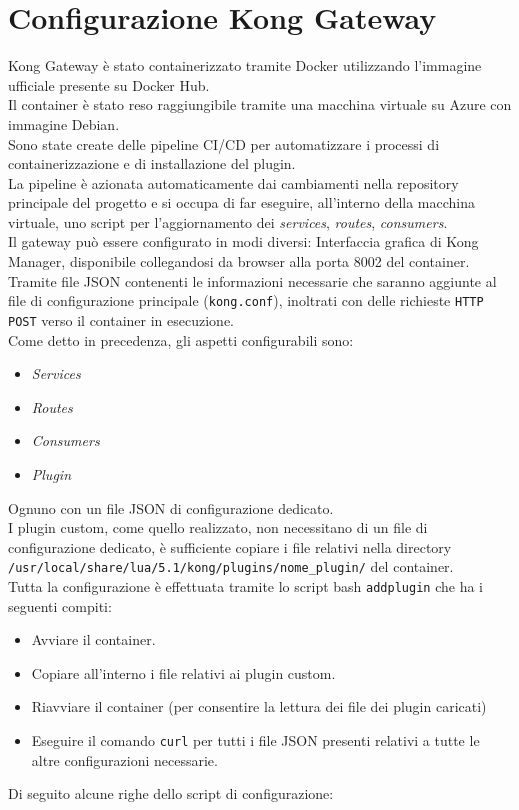 \section{Configurazione Kong Gateway}\label{sec:kongconf}
Kong Gateway è stato containerizzato tramite Docker utilizzando l'immagine ufficiale presente su Docker Hub.\\
Il container è stato reso raggiungibile tramite una macchina virtuale su Azure con immagine Debian.\\
Sono state create delle pipeline CI/CD per automatizzare i processi di containerizzazione e di installazione del plugin.\\
La pipeline è azionata automaticamente dai cambiamenti nella repository principale del progetto e si occupa di far eseguire, all'interno della macchina virtuale, uno script per l'aggiornamento dei \emph{services}, \emph{routes}, \emph{consumers}.\\

Il gateway può essere configurato in modi diversi:
Interfaccia grafica di Kong Manager, disponibile collegandosi da browser alla porta 8002 del container.
Tramite file JSON contenenti le informazioni necessarie che saranno aggiunte al file di configurazione principale (\texttt{kong.conf}), inoltrati con delle richieste \texttt{HTTP POST} verso il container in esecuzione.
\\
Come detto in precedenza, gli aspetti configurabili sono:
\begin{itemize}
	\item\emph{Services}
	\item\emph{Routes}
	\item\emph{Consumers}
	\item\emph{Plugin}
\end{itemize}

Ognuno con un file JSON di configurazione dedicato.\\
I plugin custom, come quello realizzato, non necessitano di un file di configurazione dedicato, è sufficiente copiare i file relativi nella directory\\
\texttt{/usr/local/share/lua/5.1/kong/plugins/nome\_plugin/} del container.\\

Tutta la configurazione è effettuata tramite lo script bash \texttt{addplugin} che ha i seguenti compiti:
\begin{itemize}
\item Avviare il container.
\item Copiare all'interno i file relativi ai plugin custom.
\item Riavviare il container (per consentire la lettura dei file dei plugin caricati)
\item Eseguire il comando \texttt{curl} per tutti i file JSON presenti relativi a tutte le altre configurazioni necessarie.
\end{itemize}
Di seguito alcune righe dello script di configurazione:

